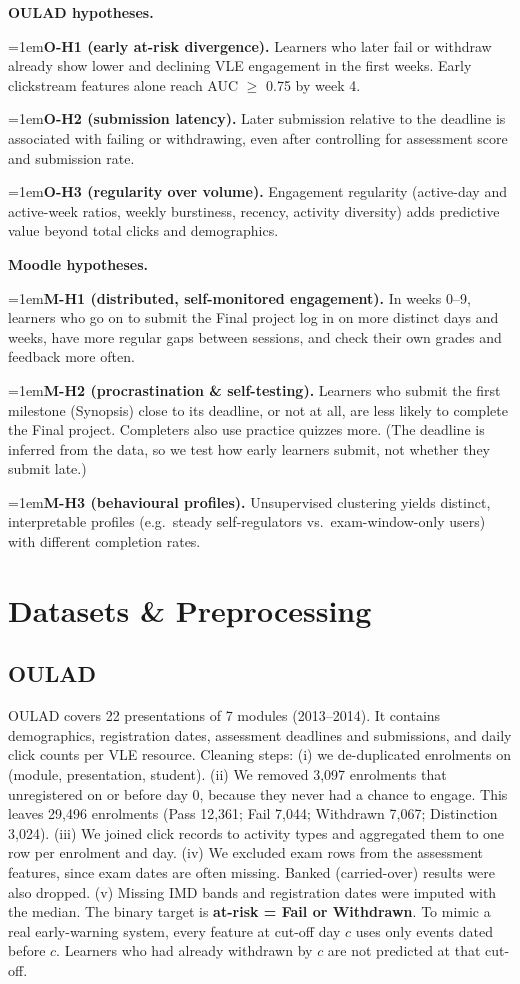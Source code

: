 \documentclass[10pt,a4paper]{article}
\newcommand{\hyp}[2]{\par\hangindent=1em\hangafter=0\noindent\textbf{#1} #2\par}
\begin{document}
\textbf{OULAD hypotheses.}
\hyp{O-H1 (early at-risk divergence).}{Learners who later fail or withdraw already show lower and declining VLE
engagement in the first weeks. Early clickstream features alone reach AUC $\geq$ 0.75 by week 4.}
\hyp{O-H2 (submission latency).}{Later submission relative to the deadline is associated with failing or
withdrawing, even after controlling for assessment score and submission rate.}
\hyp{O-H3 (regularity over volume).}{Engagement regularity (active-day and active-week ratios, weekly burstiness,
recency, activity diversity) adds predictive value beyond total clicks and demographics.}

\textbf{Moodle hypotheses.}
\hyp{M-H1 (distributed, self-monitored engagement).}{In weeks 0--9, learners who go on to submit the Final project
log in on more distinct days and weeks, have more regular gaps between sessions, and check their own grades and
feedback more often.}
\hyp{M-H2 (procrastination \& self-testing).}{Learners who submit the first milestone (Synopsis) close to its
deadline, or not at all, are less likely to complete the Final project. Completers also use practice quizzes more.
(The deadline is inferred from the data, so we test how early learners submit, not whether they submit late.)}
\hyp{M-H3 (behavioural profiles).}{Unsupervised clustering yields distinct, interpretable profiles (e.g.\ steady
self-regulators vs.\ exam-window-only users) with different completion rates.}

\section{Datasets \& Preprocessing}
\subsection{OULAD}
OULAD \cite{kuzilek2017} covers 22 presentations of 7 modules (2013--2014). It contains demographics, registration
dates, assessment deadlines and submissions, and daily click counts per VLE resource. Cleaning steps:
(i) we de-duplicated enrolments on (module, presentation, student).
(ii) We removed 3,097 enrolments that unregistered on or before day 0, because they never had a chance to engage.
This leaves 29,496 enrolments (Pass 12,361; Fail 7,044; Withdrawn 7,067; Distinction 3,024).
(iii) We joined click records to activity types and aggregated them to one row per enrolment and day.
(iv) We excluded exam rows from the assessment features, since exam dates are often missing. Banked (carried-over)
results were also dropped.
(v) Missing IMD bands and registration dates were imputed with the median.
The binary target is \textbf{at-risk = Fail or Withdrawn}. To mimic a real early-warning system, every feature at
cut-off day $c$ uses only events dated before $c$. Learners who had already withdrawn by $c$ are not predicted at
that cut-off.
\end{document}

